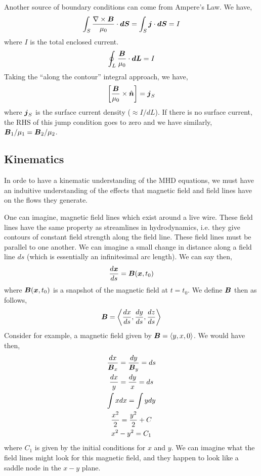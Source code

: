 \documentclass{article}
\begin{document}
Another source of boundary conditions can come from Ampere's Law. We have, 
\begin{gather*}
    \int_S \frac{\nabla\times\boldsymbol{B}}{\mu_0} \cdot\boldsymbol{dS} = \int_S \boldsymbol{j}\cdot\boldsymbol{dS} =
    I
\end{gather*}
where $I$ is the total enclosed current. 
\begin{gather*}
    \oint_L \frac{\boldsymbol{B}}{\mu_0} \cdot\boldsymbol{dL} = I
\end{gather*}
Taking the ``along the contour'' integral approach, we have,
\begin{gather*}
    \left[\frac{\boldsymbol{B}}{\mu_0} \times \hat{\boldsymbol{n}}\right] = \boldsymbol{j}_S
\end{gather*}
where $\boldsymbol{j}_S$ is the surface current density ($\approx I/dL$). If there is no
surface current, the RHS of this jump condition goes to zero and we have
similarly, $\boldsymbol{B}_1/\mu_1 = \boldsymbol{B}_2/\mu_2$. 

\subsection{Kinematics}

In orde to have a kinematic understanding of the MHD equations, we must have an
induitive understanding of the effects that magnetic field and field lines have
on the flows they generate. 

One can imagine, magnetic field lines which exist around a live wire. These
field lines have the same property as streamlines in hydrodynamics, i.e. they
give contours of constant field strength along the field line. These field lines
must be parallel to one another. We can imagine a small change in distance along
a field line $ds$ (which is essentially an infinitesimal arc length). We can
say then, 
\begin{gather*}
   \frac{d\boldsymbol{x}}{ds} = \boldsymbol{B}(\boldsymbol{x},t_0)
\end{gather*}
where $\boldsymbol{B}(\boldsymbol{x},t_0)$ is a snapshot of the magnetic field at $t = t_0$. 
We define $\boldsymbol{B}$ then as follows, 
\begin{gather*}
    \boldsymbol{B} = \left< \frac{dx}{ds}, \frac{dy}{ds},\frac{dz}{ds}\right>
\end{gather*}
Consider for example, a magnetic field given by $\boldsymbol{B} = \left<y, x, 0\right>$. We
would have then, 
\begin{gather*}
    \frac{dx}{\boldsymbol{B}_x} = \frac{dy}{\boldsymbol{B}_y} = ds\\
    \frac{dx}{y} = \frac{dy}{x} = ds\\
    \int xdx = \int ydy \\
    \frac{x^2}{2} = \frac{y^2}{2} + C\\
    x^2 - y^2 = C_1
\end{gather*}
where $C_1$ is given by the initial conditions for $x$ and $y$. We can imagine
what the field lines might look for this magnetic field, and they happen to look
like a saddle node in the $x-y$ plane. 
\end{document}
